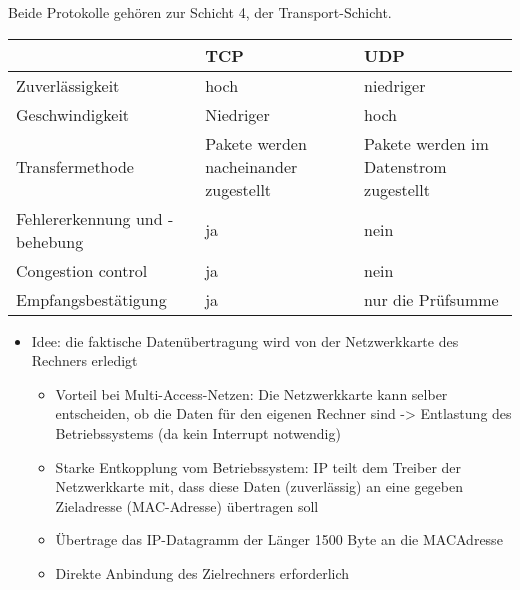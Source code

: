 Beide Protokolle gehören zur Schicht 4, der Transport-Schicht.
\bigbreak
\begin{tabularx}{\textwidth}{|X|X|X|}
    \hline
    & TCP                                   & UDP                                    \\
    \hline
    Zuverlässigkeit                & hoch                                  & niedriger                              \\
    \hline
    Geschwindigkeit                & Niedriger                             & hoch                                   \\
    \hline
    Transfermethode                & Pakete werden nacheinander zugestellt & Pakete werden im Datenstrom zugestellt \\
    \hline
    Fehlererkennung und - behebung & ja                                    & nein                                   \\
    \hline
    Congestion control             & ja                                    & nein                                   \\
    \hline
    Empfangsbestätigung            & ja                                    & nur die Prüfsumme                      \\
    \hline
\end{tabularx}

\begin{itemize}
    \item Idee: die faktische Datenübertragung wird von der Netzwerkkarte des Rechners erledigt
    \begin{itemize}
        \item Vorteil bei Multi-Access-Netzen: Die Netzwerkkarte kann selber entscheiden, ob die Daten für den eigenen Rechner sind -> Entlastung des Betriebssystems (da kein Interrupt notwendig)
        \item Starke Entkopplung vom Betriebssystem: IP teilt dem Treiber der Netzwerkkarte mit, dass diese Daten (zuverlässig) an eine gegeben Zieladresse (MAC-Adresse) übertragen soll
        \item Übertrage das IP-Datagramm der Länger 1500 Byte an die MACAdresse
        \item Direkte Anbindung des Zielrechners erforderlich
    \end{itemize}
\end{itemize}